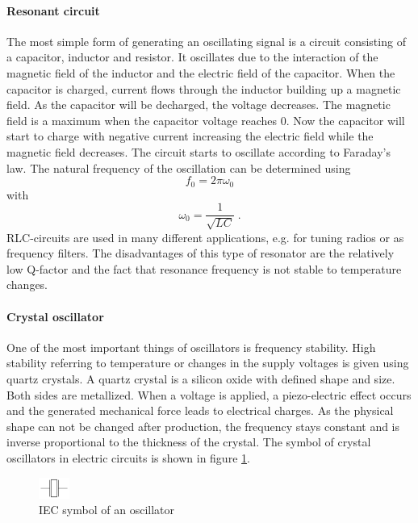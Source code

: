 \paragraph{Resonant circuit\\}
The most simple form of generating an oscillating signal is a circuit consisting of a capacitor, inductor and resistor. It oscillates due to the interaction of the magnetic field of the inductor and the electric field of the capacitor. When the capacitor is charged, current flows through the inductor building up a magnetic field. As the capacitor will be decharged, the voltage decreases. The magnetic field is a maximum when the capacitor voltage reaches 0. Now the capacitor will start to charge with negative current increasing the electric field while the magnetic field decreases. The circuit starts to oscillate according to Faraday's law. The natural frequency of the oscillation can be determined using
\begin{equation}
f_0=2\pi\omega_0
\end{equation}
with
\begin{equation}
\omega_0=\frac{1}{\sqrt{LC}}\;.
\end{equation}
RLC-circuits are used in many different applications, e.g. for tuning radios or as frequency filters. The disadvantages of this type of resonator are the relatively low Q-factor and the fact that resonance frequency is not stable to temperature changes.
\paragraph{Crystal oscillator\\}
One of the most important things of oscillators is frequency stability. High stability referring to temperature or changes in the supply voltages is given using quartz crystals. A quartz crystal is a silicon oxide with defined shape and size. Both sides are metallized. When a voltage is applied, a piezo-electric effect occurs and the generated mechanical force leads to electrical charges. As the physical shape can not be changed after production, the frequency stays constant and is inverse proportional to the thickness of the crystal. The symbol of crystal oscillators in electric circuits is shown in figure \ref{fig:crystaloscillatorsymbol}.
\begin{figure}[htbp]
\begin{center}
\includegraphics[width=1cm,keepaspectratio=true]{bilder/png/crystaloscillatorsymbol}
\caption{IEC symbol of an oscillator}
\label{fig:crystaloscillatorsymbol}
\end{center}
\end{figure}
